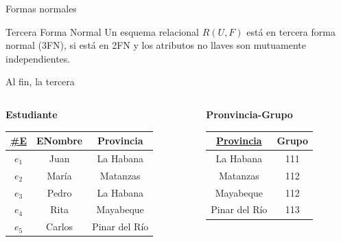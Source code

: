 \begin{frame}{Formas normales}
    \begin{block}{Tercera Forma Normal}
        Un esquema relacional $R(U,F)$ est\'a en tercera forma normal
        (3FN), si est\'a en 2FN y los atributos no llaves son mutuamente independientes.
        
    \end{block}
\end{frame}


\begin{frame}{Al fin, la tercera}
    \vspace{-3mm}
    \begin{columns}[T]
        \begin{column}{0.68\linewidth}
            \begin{columns}[T]
                \begin{column}{0.6\textwidth}
                    \begin{center}
                        \textbf{Estudiante}\\[2mm]
        
                        \begin{tabular}{ccc}
                            \underline{\#E} & ENombre & Provincia\\[1mm]
                            \hline
                            $e_1$ & Juan & La Habana\\
                            $e_2$ & Mar\'ia & Matanzas\\
                            $e_3$ & Pedro & La Habana\\
                            $e_4$ & Rita & Mayabeque\\
                            $e_5$ & Carlos & Pinar del R\'io
                        \end{tabular}
                    \end{center}
                \end{column}

                \begin{column}{0.4\textwidth}
                    \begin{center}
                        \textbf{Pronvincia-Grupo}\\[2mm]
        
                        \begin{tabular}{cc}
                            \underline{Provincia} & Grupo\\[1mm]
                            \hline
                            La Habana & 111\\
                            Matanzas & 112 \\
                            Mayabeque & 112 \\
                            Pinar del R\'io & 113
                            

\end{tabular}
\end{center}
\end{column}
\end{columns}
\end{column}
\end{columns}
\end{frame}
